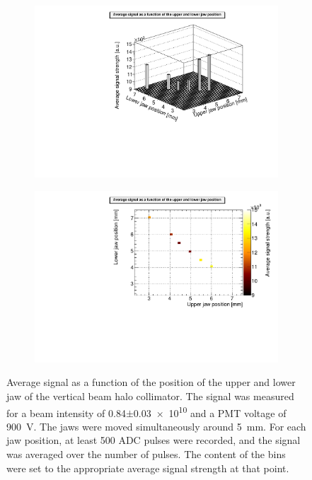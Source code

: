 \begin{figure}
\begin{subfigure}[b]{0.5\textwidth}
\includegraphics[width=\textwidth]{Figures/AsymmetricScan_5mm_beamintensity084_lego.pdf}
\end{subfigure}
\begin{subfigure}[b]{0.5\textwidth}
\includegraphics[width=\textwidth]{Figures/AsymmetricScan_5mm_beamintensity084_colz.pdf}
\end{subfigure}
\caption[RHUL Cherenkov detector signal for certain upper/lower jaw positions around \SI{5}{\milli\metre}, for a beam intensity of \num{0.84}$\pm$\num{0.03e10}]{Average signal as a function of the position of the upper and lower jaw of the vertical beam halo collimator. The signal was measured for a beam intensity of \num{0.84}$\pm$\num{0.03e10} and a PMT voltage of \SI{900}{\volt}. The jaws were moved simultaneously around \SI{5}{\milli\metre}. For each jaw position, at least 500 ADC pulses were recorded, and the signal was averaged over the number of pulses. The content of the bins were set to the appropriate average signal strength at that point.}
\label{fig:AverageSignal_Asymmetric_5mm_084}
\end{figure}
